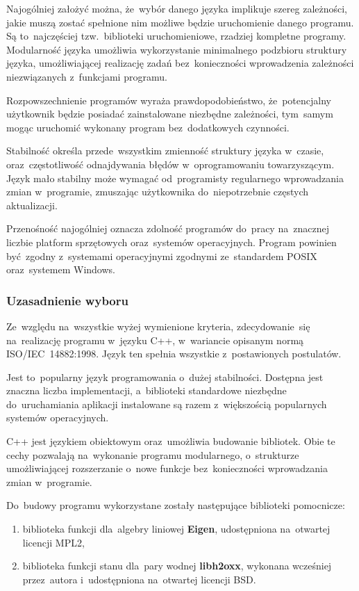 Najogólniej założyć można, że~wybór danego języka implikuje szereg
zależności, jakie muszą zostać spełnione nim możliwe będzie uruchomienie
danego programu. Są to~najczęściej tzw.~biblioteki uruchomieniowe,
rzadziej kompletne programy. Modularność języka umożliwia wykorzystanie
minimalnego podzbioru struktury języka, umożliwiającej realizację zadań
bez~konieczności wprowadzenia zależności niezwiązanych z~funkcjami
programu.

Rozpowszechnienie programów wyraża prawdopodobieństwo, że~potencjalny
użytkownik będzie posiadać zainstalowane niezbędne zależności, tym~samym
mogąc uruchomić wykonany program bez~dodatkowych czynności.

Stabilność określa przede~wszystkim zmienność struktury języka w~czasie,
oraz~częstotliwość odnajdywania błędów w~oprogramowaniu towarzyszącym.
Język mało stabilny może wymagać od~programisty regularnego wprowadzania
zmian w~programie, zmuszając użytkownika do~niepotrzebnie częstych
aktualizacji.

Przenośność najogólniej oznacza zdolność programów do~pracy na~znacznej
liczbie platform sprzętowych oraz~systemów operacyjnych. Program
powinien być~zgodny z~systemami operacyjnymi zgodnymi ze~standardem
POSIX oraz~systemem Windows.


\subsubsection{Uzasadnienie wyboru}

Ze~względu na~wszystkie wyżej wymienione kryteria, zdecydowanie~się
na~realizację programu w~języku C++, w~wariancie opisanym normą
ISO/IEC~14882:1998. Język ten spełnia wszystkie z~postawionych
postulatów.

Jest to~popularny język programowania o~dużej stabilności. Dostępna jest
znaczna liczba implementacji, a~biblioteki standardowe niezbędne
do~uruchamiania aplikacji instalowane są razem z~większością popularnych
systemów operacyjnych.

C++ jest językiem obiektowym oraz~umożliwia budowanie bibliotek. Obie te
cechy pozwalają na~wykonanie programu modularnego, o~strukturze
umożliwiającej rozszerzanie o~nowe funkcje bez~konieczności wprowadzania
zmian w~programie.

Do~budowy programu wykorzystane zostały następujące biblioteki
pomocnicze:

\begin{enumerate}

	\item biblioteka funkcji dla~algebry liniowej \textbf{Eigen}, udostępniona
		na~otwartej licencji MPL2,

	\item biblioteka funkcji stanu dla~pary wodnej \textbf{libh2oxx},
		wykonana wcześniej przez~autora i~udostępniona na~otwartej
		licencji BSD.

\end{enumerate}


